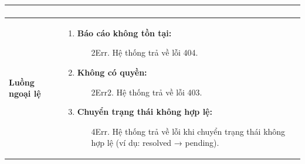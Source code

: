 {\begin{tabularx}{\textwidth}{|>{\raggedright\arraybackslash}X|>{\raggedright\arraybackslash}X|}
\begin{enumerate}
\end{enumerate} \\
\hline
\textbf{Luồng ngoại lệ} &
\begin{enumerate}
    \item \textbf{Báo cáo không tồn tại:}
    \begin{enumerate}
        \item[2Err.] Hệ thống trả về lỗi 404.
    \end{enumerate}
    \item \textbf{Không có quyền:}
    \begin{enumerate}
        \item[2Err2.] Hệ thống trả về lỗi 403.
    \end{enumerate}
    \item \textbf{Chuyển trạng thái không hợp lệ:}
    \begin{enumerate}
        \item[4Err.] Hệ thống trả về lỗi khi chuyển trạng thái không hợp lệ (ví dụ: resolved → pending).
    \end{enumerate}
\end{enumerate} \\
\hline
\end{tabularx}
}
